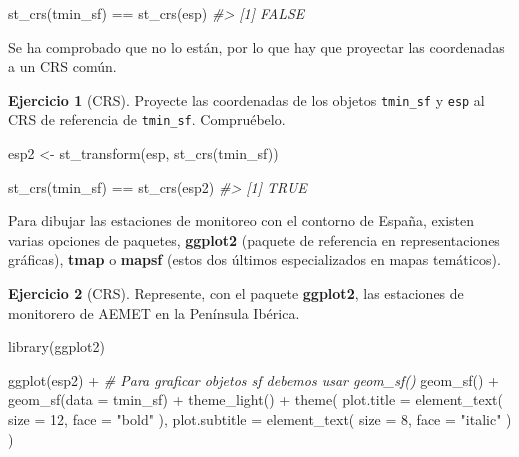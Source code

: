 \documentclass[
]{report}
\newenvironment{Shaded}{\begin{snugshade}}{\end{snugshade}}
\newcommand{\AttributeTok}[1]{\textcolor[rgb]{0.77,0.63,0.00}{#1}}
\newcommand{\CommentTok}[1]{\textcolor[rgb]{0.56,0.35,0.01}{\textit{#1}}}
\newcommand{\DecValTok}[1]{\textcolor[rgb]{0.00,0.00,0.81}{#1}}
\newcommand{\FunctionTok}[1]{\textcolor[rgb]{0.00,0.00,0.00}{#1}}
\newcommand{\NormalTok}[1]{#1}
\newcommand{\OtherTok}[1]{\textcolor[rgb]{0.56,0.35,0.01}{#1}}
\newcommand{\SpecialCharTok}[1]{\textcolor[rgb]{0.00,0.00,0.00}{#1}}
\newcommand{\StringTok}[1]{\textcolor[rgb]{0.31,0.60,0.02}{#1}}
\theoremstyle{definition}
\theoremstyle{definition}
\theoremstyle{definition}
\newtheorem{exercise}{Ejercicio}[chapter]
\theoremstyle{definition}
\theoremstyle{remark}
\begin{document}
\begin{Shaded}
\begin{Highlighting}[]
\FunctionTok{st\_crs}\NormalTok{(tmin\_sf) }\SpecialCharTok{==} \FunctionTok{st\_crs}\NormalTok{(esp)}
\CommentTok{\#\textgreater{} [1] FALSE}
\end{Highlighting}
\end{Shaded}

Se ha comprobado que no lo están, por lo que hay que proyectar las coordenadas a
un CRS común.

\begin{exercise}[CRS]
\protect\hypertarget{exr:ex8}{}\label{exr:ex8}Proyecte las coordenadas de los objetos \texttt{tmin\_sf} y \texttt{esp} al CRS de referencia
de \texttt{tmin\_sf}. Compruébelo.
\end{exercise}

\begin{Shaded}
\begin{Highlighting}[]
\NormalTok{esp2 }\OtherTok{\textless{}{-}} \FunctionTok{st\_transform}\NormalTok{(esp, }\FunctionTok{st\_crs}\NormalTok{(tmin\_sf))}

\FunctionTok{st\_crs}\NormalTok{(tmin\_sf) }\SpecialCharTok{==} \FunctionTok{st\_crs}\NormalTok{(esp2)}
\CommentTok{\#\textgreater{} [1] TRUE}
\end{Highlighting}
\end{Shaded}

Para dibujar las estaciones de monitoreo con el contorno de España, existen
varias opciones de paquetes, \textbf{ggplot2} \citep{R-ggplot} (paquete de referencia en
representaciones gráficas), \textbf{tmap} \citep{R-tmap} o \textbf{mapsf} \citep{R-mapsf} (estos dos
últimos especializados en mapas temáticos).

\begin{exercise}[CRS]
\protect\hypertarget{exr:ex9}{}\label{exr:ex9}Represente, con el paquete \textbf{ggplot2}, las estaciones de monitorero de AEMET en
la Península Ibérica.
\end{exercise}

\begin{Shaded}
\begin{Highlighting}[]
\FunctionTok{library}\NormalTok{(ggplot2)}

\FunctionTok{ggplot}\NormalTok{(esp2) }\SpecialCharTok{+}
  \CommentTok{\# Para graficar objetos sf debemos usar geom\_sf()}
  \FunctionTok{geom\_sf}\NormalTok{() }\SpecialCharTok{+}
  \FunctionTok{geom\_sf}\NormalTok{(}\AttributeTok{data =}\NormalTok{ tmin\_sf) }\SpecialCharTok{+}
  \FunctionTok{theme\_light}\NormalTok{() }\SpecialCharTok{+}
  \FunctionTok{theme}\NormalTok{(}
    \AttributeTok{plot.title =} \FunctionTok{element\_text}\NormalTok{(}
      \AttributeTok{size =} \DecValTok{12}\NormalTok{,}
      \AttributeTok{face =} \StringTok{"bold"}
\NormalTok{    ),}
    \AttributeTok{plot.subtitle =} \FunctionTok{element\_text}\NormalTok{(}
      \AttributeTok{size =} \DecValTok{8}\NormalTok{,}
      \AttributeTok{face =} \StringTok{"italic"}
\NormalTok{    )}
\NormalTok{  )}
\end{Highlighting}
\end{Shaded}
\end{document}
